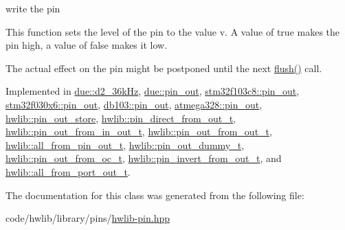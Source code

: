 write the pin

This function sets the level of the pin to the value v. A value of true makes the pin high, a value of false makes it low.

The actual effect on the pin might be postponed until the next \hyperlink{classhwlib_1_1pin__out_ac22910317477a52431a44e7e3c66fc57}{flush()} call. 

Implemented in \hyperlink{classdue_1_1d2__36kHz_a21694f90fcb5b29d0839f98e473bfedb}{due\+::d2\+\_\+36k\+Hz}, \hyperlink{classdue_1_1pin__out_aa9127ae6a6d0c5f607569d9f67c5fa2b}{due\+::pin\+\_\+out}, \hyperlink{classstm32f103c8_1_1pin__out_af1d21fc8d9b0d8dc2c4b5e9aadef12f5}{stm32f103c8\+::pin\+\_\+out}, \hyperlink{classstm32f030x6_1_1pin__out_a6f859b59bf358e37fffe4d20fc5a718a}{stm32f030x6\+::pin\+\_\+out}, \hyperlink{classdb103_1_1pin__out_adb5167058deb8fbd3e4c1bbdb456a6e3}{db103\+::pin\+\_\+out}, \hyperlink{classatmega328_1_1pin__out_ae95d42790e9d8d97fb372637bf3c76e6}{atmega328\+::pin\+\_\+out}, \hyperlink{classhwlib_1_1pin__out__store_a9ac425ba85709b5c1095e90a94445c77}{hwlib\+::pin\+\_\+out\+\_\+store}, \hyperlink{classhwlib_1_1pin__direct__from__out__t_aa6a52997e8ceb4c0c6489253f84264db}{hwlib\+::pin\+\_\+direct\+\_\+from\+\_\+out\+\_\+t}, \hyperlink{classhwlib_1_1pin__out__from__in__out__t_a6171cefa50ff9db91e17eb6e1d8a3d74}{hwlib\+::pin\+\_\+out\+\_\+from\+\_\+in\+\_\+out\+\_\+t}, \hyperlink{classhwlib_1_1pin__out__from__out__t_acda4bf8988bab6746d7bb9d520c303ce}{hwlib\+::pin\+\_\+out\+\_\+from\+\_\+out\+\_\+t}, \hyperlink{classhwlib_1_1all__from__pin__out__t_aa718f395267d22934d63c1d90ff83896}{hwlib\+::all\+\_\+from\+\_\+pin\+\_\+out\+\_\+t}, \hyperlink{classhwlib_1_1pin__out__dummy__t_a155ff6021cfacdbed10f34ec1aef1630}{hwlib\+::pin\+\_\+out\+\_\+dummy\+\_\+t}, \hyperlink{classhwlib_1_1pin__out__from__oc__t_afdf1cb4bb1f50aa735986af3b0e49d01}{hwlib\+::pin\+\_\+out\+\_\+from\+\_\+oc\+\_\+t}, \hyperlink{classhwlib_1_1pin__invert__from__out__t_a0b069e2298848bd45ff1cc302d811e53}{hwlib\+::pin\+\_\+invert\+\_\+from\+\_\+out\+\_\+t}, and \hyperlink{classhwlib_1_1all__from__port__out__t_ad062b586a43e257a4e7fa14ba3ce7d21}{hwlib\+::all\+\_\+from\+\_\+port\+\_\+out\+\_\+t}.



The documentation for this class was generated from the following file\+:\begin{DoxyCompactItemize}
\item 
code/hwlib/library/pins/\hyperlink{hwlib-pin_8hpp}{hwlib-\/pin.\+hpp}\end{DoxyCompactItemize}
